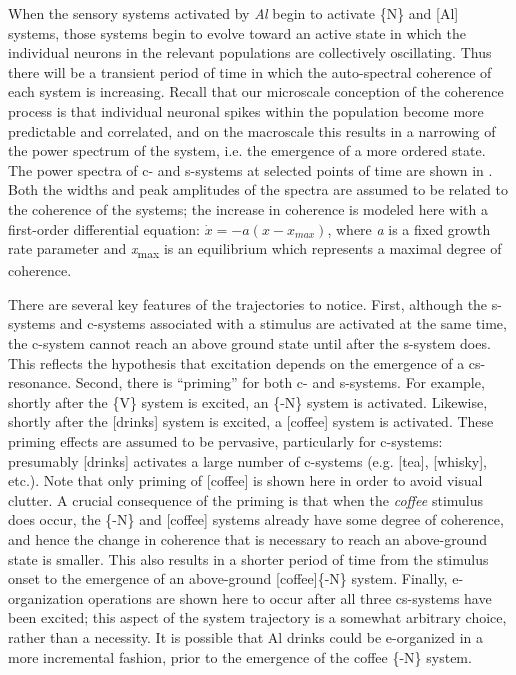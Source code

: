   When the sensory systems activated by \textit{Al} begin to activate \{N\} and [Al] systems, those systems begin to evolve toward an active state in which the individual neurons in the relevant populations are collectively oscillating. Thus there will be a transient period of time in which the auto-spectral coherence of each system is increasing. Recall that our microscale conception of the coherence process is that individual neuronal spikes within the population become more predictable and correlated, and on the macroscale this results in a narrowing of the power spectrum of the system, i.e. the emergence of a more ordered state. The power spectra of c- and s-systems at selected points of time are shown in {}. Both the widths and peak amplitudes of the spectra are assumed to be related to the coherence of the systems; the increase in coherence is modeled here with a first-order differential equation:  $\dot{{x}}=-a\left(x-{x}_{\mathit{max}}\right)$, where \textit{a} is a fixed growth rate parameter and \textit{x}\textsubscript{max} is an equilibrium which represents a maximal degree of coherence. 

  There are several key features of the trajectories to notice. First, although the s-systems and c-systems associated with a stimulus are activated at the same time, the c-system cannot reach an above ground state until after the s-system does. This reflects the hypothesis that excitation depends on the emergence of a cs-resonance. Second, there is “priming” for both c- and s-systems. For example, shortly after the \{V\} system is excited, an \{-N\} system is activated. Likewise, shortly after the [drinks] system is excited, a [coffee] system is activated. These priming effects are assumed to be pervasive, particularly for c-systems: presumably [drinks] activates a large number of c-systems (e.g. [tea], [whisky], etc.). Note that only priming of [coffee] is shown here in order to avoid visual clutter. A crucial consequence of the priming is that when the \textit{coffee} stimulus does occur, the \{-N\} and [coffee] systems already have some degree of coherence, and hence the change in coherence that is necessary to reach an above-ground state is smaller. This also results in a shorter period of time from the stimulus onset to the emergence of an above-ground [coffee]\{-N\} system. Finally, e-organization operations are shown here to occur after all three cs-systems have been excited; this aspect of the system trajectory is a somewhat arbitrary choice, rather than a necessity. It is possible that {\textbar}Al drinks{\textbar} could be e-organized in a more incremental fashion, prior to the emergence of the {\textbar}coffee \{-N\}{\textbar} system. 

